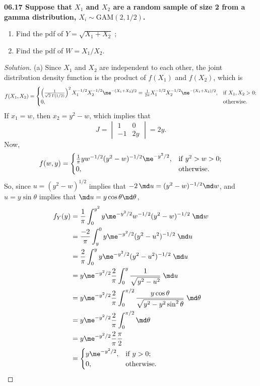 \par{}
\vspace{1cm}
\begin{exercise1}
  \bf{06.17} Suppose that $X_1$ and $X_2$ are a random sample of size 2 from a gamma distribution, $X_i\sim\mathrm{GAM}(2,1/2)$.
    \begin{enumerate}
      \item
        Find the pdf of $Y=\sqrt{X_1+X_2}\;;$
      \item
        Find the pdf of $W={X_1}/{X_2}$.
    \end{enumerate}
\end{exercise1}

\begin{proof}[Solution]
  (a) Since $X_1$ and $X_2$ are independent to each other,
  the joint distribution density function is the product of $f(X_1)$ and $f(X_2)$, which is
    $$
      f(X_1,X_2)=
        \begin{cases}
          \left(\frac{1}{\sqrt{2}\;\Gamma(1/2)}\right)^2X_1^{-1/2}X_2^{-1/2}\me^{-(X_1+X_2)\!/2}
          =\frac{1}{2\pi}X_1^{-1/2}X_2^{-1/2}\me^{-(X_1+X_2)/2}, & \mathrm{if}\;X_1,X_2>0; \\
          0, & \mathrm{otherwise}.
        \end{cases}
    $$
  If $x_1=w$, then $x_2=y^2-w$, which implies that
    $$
      J=
        \begin{vmatrix}
          1 & 0 \\
          -1 & 2y
        \end{vmatrix}
      =2y.
    $$
  Now,
    $$
      f(w,y)=
        \begin{cases}
          \frac{1}{\pi}yw^{-1/2}(y^2-w)^{-1/2}\me^{-y^2/2}, & \mathrm{if}\;y^2>w>0; \\
          0, & \mathrm{otherwise}.
        \end{cases}
    $$
  So, since $u=(y^2-w)^{1/2}$ implies that $-2\,\md u=(y^2-w)^{-1/2}\md w$, and $u=y\sin\theta$ implies that $\md u=y\cos\theta \md \theta$,
    \begin{align*}
      f_Y(y)&=\frac{1}{\pi}\int_0^{y^2}y\me^{-y^2/2}w^{-1/2}(y^2-w)^{-1/2}\;\md w \\
      &=\frac{-2}{\pi}\int_y^0y\me^{-y^2/2}(y^2-u^2)^{-1/2}\;\md u \\
      &=\frac{2}{\pi}\int_0^yy\me^{-y^2/2}(y^2-u^2)^{-1/2}\;\md u \\ &=y\me^{-y^2/2}\frac{2}{\pi}\int_0^y\frac{1}{\sqrt{y^2-u^2}}\;\md u\\
      &=y\me^{-y^2/2}\frac{2}{\pi}\int_0^{\pi/2}\frac{y\cos\theta}{\sqrt{y^2-y^2\sin^2\theta}}\;\md \theta\\
      &=y\me^{-y^2/2}\frac{2}{\pi}\int_0^{\pi/2}\md \theta\\
      &=y\me^{-y^2/2}\frac{2}{\pi}\frac{\pi}{2}\\
      &=\begin{cases}
         y\me^{-y^2/2}, & \mathrm{if}\;y>0; \\
          0, & \mathrm{otherwise}.
        \end{cases}
    \end{align*}


\end{proof}
